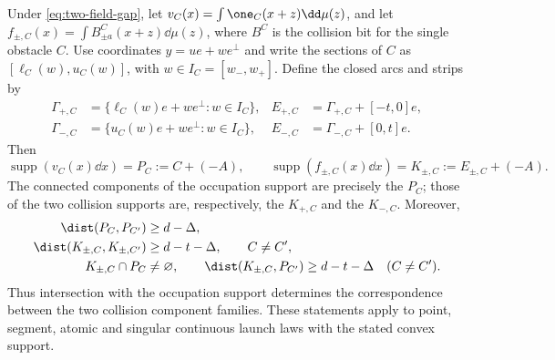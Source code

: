 \begin{proposition}
\label{prop:singular-support-components}
Under \eqref{eq:two-field-gap}, let
$v_C(x)=\int\one_C(x+z)\dd\mu(z)$, and let
$f_{\pm,C}(x)=\int B^{C}_{\pm a}(x+z)\dd\mu(z)$,
where $B^{C}$ is the collision bit for the single obstacle $C$.
Use coordinates $y=ue+we^\perp$ and write the sections of $C$ as
$[\ell_C(w),u_C(w)]$, with $w\in I_C=[w_-,w_+]$.
Define the closed arcs and strips by
\begin{align*}
 \Gamma_{+,C}&=\{\ell_C(w)e+we^\perp:w\in I_C\},&
 E_{+,C}&=\Gamma_{+,C}+[-t,0]e,\\
 \Gamma_{-,C}&=\{u_C(w)e+we^\perp:w\in I_C\},&
 E_{-,C}&=\Gamma_{-,C}+[0,t]e.
\end{align*}
Then
\begin{equation}\label{eq:singular-individual-supports}
 \operatorname{supp}(v_C(x)\dd x)=P_C:=C+(-A),\qquad
 \operatorname{supp}(f_{\pm,C}(x)\dd x)
                         =K_{\pm,C}:=E_{\pm,C}+(-A).
\end{equation}
The connected components of the occupation support are precisely
the $P_C$; those of the two collision supports are, respectively,
the $K_{+,C}$ and the $K_{-,C}$.  Moreover,
\begin{align}
 \dist(P_C,P_{C'})&\ge d-\Delta,\label{eq:singular-occupation-gap}\\
 \dist(K_{\pm,C},K_{\pm,C'})&\ge d-t-\Delta,
       \qquad C\ne C',\label{eq:singular-collision-gap}\\
 K_{\pm,C}\cap P_C&\ne\varnothing,\qquad
 \dist(K_{\pm,C},P_{C'})\ge d-t-\Delta
       \quad(C\ne C').\label{eq:singular-support-matching}
\end{align}
Thus intersection with the occupation support determines the
correspondence between the two collision component families.
These statements apply to point, segment, atomic and singular
continuous launch laws with the stated convex support.
\end{proposition}
